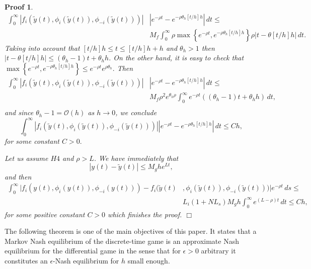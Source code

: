 \documentclass[12pt]{article}
\newtheorem{Proof}{Proof}
\newenvironment{proof}{\begin{Proof}\rm}{\hfill $\Box$ \end{Proof}}
\begin{document}
\begin{proof}
\begin{equation*}
\begin{split}
\int_0^\infty|f_i(\tilde{y}(t),{\phi}_i(\tilde{y}(t)),\phi_{-i}(\tilde{y}(t)))|&|e^{-\rho t}-e^{- \rho\theta_h[t/h]h}|\, dt\le\\&{
M_f \int_0^\infty \rho\max\left\{e^{-\rho t},e^{-\rho\theta_h[t/h]h}\right\}\rho| t- \theta[t/h]h| \, dt.}
\end{split}
\end{equation*}
{Taking into account that $[t/h]h\le t\le [t/h]h+h$ and $\theta_h>1$ then $|t- \theta[t/h]h|\le (\theta_h-1)t+\theta_h h$. On the other hand, it is easy to check that $\max\left\{e^{-\rho t},e^{-\rho\theta_h[t/h]h}\right\}
\le e^{-\rho t} e^{\rho \theta_h}.$ Then}
\begin{equation*}
\begin{split}
\int_0^\infty|f_i(\tilde{y}(t),{\phi}_i(\tilde{y}(t)),\phi_{-i}(\tilde{y}(t)))|&|e^{-\rho t}-e^{- \rho\theta_h[t/h]h}|\, dt\le\\
&M_f\rho^2 {e^{\theta_h\rho }}\int_0^{\infty}e^{-\rho t}((\theta_h-1)t+\theta_h h) \, dt,\\
\end{split}
\end{equation*}
and since
 $ \theta_h-1=\mathcal{O}(h)$ as $h\rightarrow 0$, we conclude
\begin{equation*}
\int_0^\infty|f_i(\tilde{y}(t),{\phi}_i(\tilde{y}(t)),\phi_{-i}(\tilde{y}(t)))||e^{-\rho t}-e^{- \rho\theta_h[t/h]h}|\, dt\le Ch,
\end{equation*}
for some constant $C>0.$

Let us assume $H4$ and {$\rho>L$}.
We have immediately that{
$$
|y(t)-\tilde y(t)|\le M_g h e^{Lt},
$$
}
and  then
\begin{equation*}
\begin{split}
\int_0^\infty |f_i(y(t),\phi_i(y(t)),\phi_{-i}(y(t)))-f_i(\tilde{y}(t)&,{\phi}_i(\tilde{y}(t)),\phi_{-i}(\tilde{y}(t)))|e^{-\rho t}\, ds\le \\
&L_i(1+NL_s)M_gh\int_0^\infty e^{(L-\rho)t}\, dt \le Ch,
\end{split}
\end{equation*}
for some positive constant $C>0$ which finishes the proof.
\end{proof}
The following theorem is one of the main objectives of this paper. It states that a Markov Nash equilibrium of the discrete-time game is an approximate Nash equilibrium for the differential game in the sense that for $\epsilon>0$ arbitrary it constitutes an $\epsilon$-Nash equilibrium for $h$ small enough.
\end{document}
